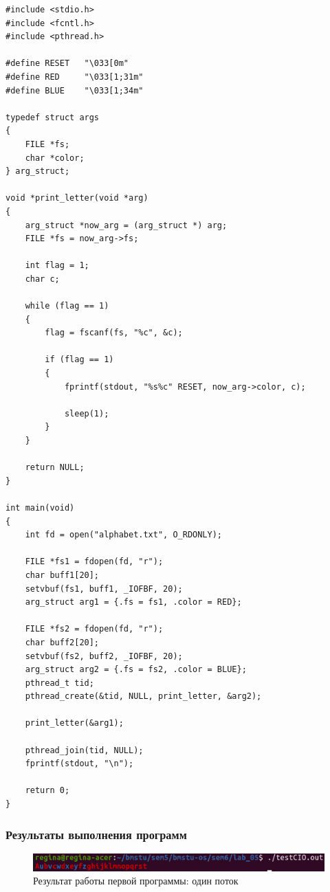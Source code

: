 \begin{center}
    \captionsetup{justification=raggedright,singlelinecheck=off}
    \begin{lstlisting}[label=lst:CIO2,caption=Два потока]
#include <stdio.h>
#include <fcntl.h>
#include <pthread.h>

#define RESET   "\033[0m"
#define RED     "\033[1;31m"
#define BLUE    "\033[1;34m"

typedef struct args
{
    FILE *fs;
    char *color;
} arg_struct;

void *print_letter(void *arg) 
{
    arg_struct *now_arg = (arg_struct *) arg;
    FILE *fs = now_arg->fs;

    int flag = 1;
    char c;

    while (flag == 1) 
    {
        flag = fscanf(fs, "%c", &c);

        if (flag == 1)
        {
            fprintf(stdout, "%s%c" RESET, now_arg->color, c);

            sleep(1);
        }
    }

    return NULL;
}

int main(void)
{
    int fd = open("alphabet.txt", O_RDONLY);
    
    FILE *fs1 = fdopen(fd, "r");
    char buff1[20];
    setvbuf(fs1, buff1, _IOFBF, 20);
    arg_struct arg1 = {.fs = fs1, .color = RED};
    
    FILE *fs2 = fdopen(fd, "r");
    char buff2[20];
    setvbuf(fs2, buff2, _IOFBF, 20);
    arg_struct arg2 = {.fs = fs2, .color = BLUE};
    pthread_t tid;
    pthread_create(&tid, NULL, print_letter, &arg2);

    print_letter(&arg1);

    pthread_join(tid, NULL);
    fprintf(stdout, "\n");

    return 0;
}
\end{lstlisting}
\end{center}

\subsubsection{Результаты выполнения программ}

\begin{figure}[H]
	\begin{center}
		\includegraphics[scale=0.4]{img/CIO1.png}
	\end{center}
	\captionsetup{justification=centering}
	\caption{Результат работы первой программы: один поток}
	\label{img:CIO1}
\end{figure}


